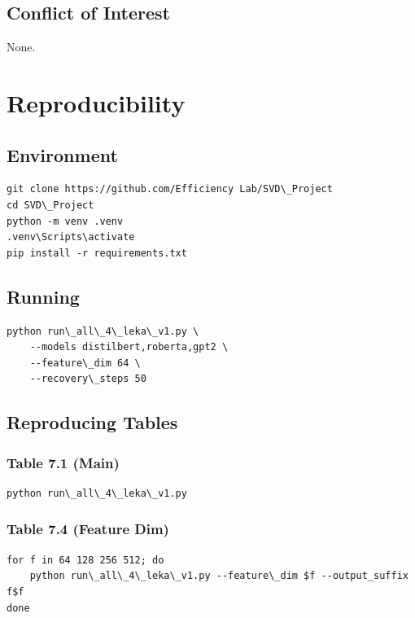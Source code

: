 \subsection{Conflict of Interest}

None.



\section{Reproducibility}

\subsection{Environment}

\begin{lstlisting}
git clone https://github.com/Efficiency Lab/SVD\_Project
cd SVD\_Project
python -m venv .venv
.venv\Scripts\activate
pip install -r requirements.txt
\end{lstlisting}

\subsection{Running}

\begin{lstlisting}
python run\_all\_4\_leka\_v1.py \
    --models distilbert,roberta,gpt2 \
    --feature\_dim 64 \
    --recovery\_steps 50
\end{lstlisting}

\subsection{Reproducing Tables}

\subsubsection{Table 7.1 (Main)}
\begin{lstlisting}
python run\_all\_4\_leka\_v1.py
\end{lstlisting}

\subsubsection{Table 7.4 (Feature Dim)}
\begin{lstlisting}
for f in 64 128 256 512; do
    python run\_all\_4\_leka\_v1.py --feature\_dim $f --output_suffix f$f
done
\end{lstlisting}

